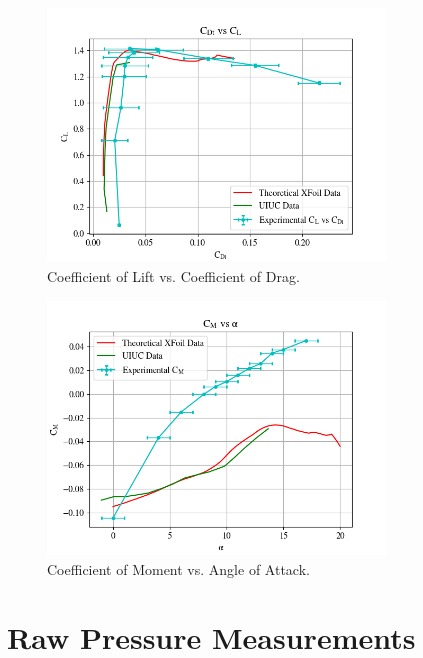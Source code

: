 \documentclass[11pt, letterpaper]{article}
\begin{document}
\begin{appendices}
\begin{figure}[!hpt]
        \centering        
        \includegraphics[width=0.8\textwidth]{Figures/C_l-C_d.png}
        \caption{Coefficient of Lift vs. Coefficient of Drag.}
        \label{fig:C_l-C}
\end{figure}

\begin{figure}[!hpt]
        \centering        
        \includegraphics[width=0.8\textwidth]{Figures/C_m-a.png}
        \caption{Coefficient of Moment vs. Angle of Attack.}
        \label{fig:C_m-a}
\end{figure}


\newpage

\section{Raw Pressure Measurements}


\end{appendices}
\end{document}

